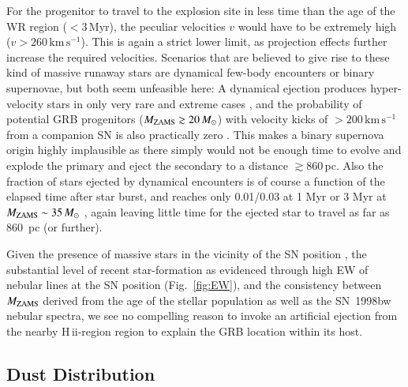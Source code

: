 \documentclass[traditabstract, referee]{aa}
\newcommand{\hii}{\mbox{H\,{\sc ii}}}
\begin{document}
For the progenitor to travel to the explosion site in less time than the age of the WR region ($<3$\,Myr), the peculiar velocities $v$ would have to be extremely high ($v>260\,\mathrm{km\,s^{-1}}$). This is again a strict lower limit, as projection effects further increase the required velocities. Scenarios that are believed to give rise to these kind of massive runaway stars are dynamical few-body encounters or binary supernovae, but both seem unfeasible here: A dynamical ejection produces hyper-velocity stars in only very rare and extreme cases \citep{2001A&A...365...49H, 2012ApJ...751..133P}, and the probability of potential GRB progenitors ($M_{\rm{ZAMS}}\gtrsim 20\,M_\odot$) with velocity kicks of $>200\,\mathrm{km\,s^{-1}}$ from a companion SN is also practically zero \citep{2011MNRAS.414.3501E}. This makes a binary supernova origin highly implausible as there simply would not be enough time to evolve and explode the primary and eject the secondary to a distance $\gtrsim860$\,pc. Also the fraction of stars ejected by dynamical encounters is of course a function of the elapsed time after star burst, and reaches only 0.01/0.03 at 1 Myr or 3 Myr at $M_{\rm{ZAMS}}\sim 35\,M_\odot$ \citep{2012ApJ...746...15B}, again leaving little time for the ejected star to travel as far as 860~pc (or further).

Given the presence of massive stars in the vicinity of the SN position \citep{2000ApJ...542L..89F}, the substantial level of recent star-formation as evidenced through high EW of nebular lines at the SN position (Fig.~\ref{fig:EW}), and the consistency between $M_{\rm{ZAMS}}$ derived from the age of the stellar population as well as the SN~1998bw nebular spectra, we see no compelling reason to invoke an artificial ejection from the nearby \hii-region region to explain the GRB location within its host.

\subsection{Dust Distribution}
\end{document}

